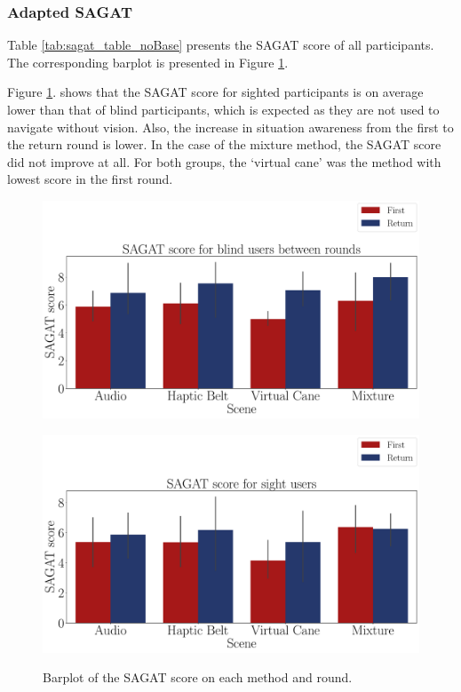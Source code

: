 \subsubsection{Adapted SAGAT}
\label{subsubsec:results_adapted_sagat_2}

Table \ref{tab:sagat_table_noBase} presents the SAGAT score of all participants. The corresponding barplot is presented in Figure \ref{fig:barplot_sagat_avg_4_scene_blind_sight}.



Figure \ref{fig:barplot_sagat_avg_4_scene_blind_sight}. shows that the SAGAT score for sighted participants is on average lower than that of blind participants, which is expected as they are not used to navigate without vision. Also, the increase in situation awareness from the first to the return round is lower. In the case of the mixture method, the SAGAT score did not improve at all. For both groups, the ‘virtual cane’ was the method with lowest score in the first round.

\begin{figure}[!htb]
    \centering
    \begin{minipage}{\textwidth}
        \centering
        \includegraphics[width = 0.8\linewidth]{Resultados/Sagat/Figuras/pdf/barplot_sagat_avg_4_scene_blind.pdf}
        \label{fig:barplot_sagat_avg_4_scene_blind}
    \end{minipage}
    \begin{minipage}{\textwidth}
        \centering
        \includegraphics[width = 0.8\linewidth]{Resultados/Sagat/Figuras/pdf/barplot_sagat_avg_4_scene_sight.pdf}
        \label{fig:barplot_sagat_avg_4_scene_sight}
    \end{minipage}
    \caption{Barplot of the SAGAT score on each method and round.}
    \label{fig:barplot_sagat_avg_4_scene_blind_sight}
\end{figure}

